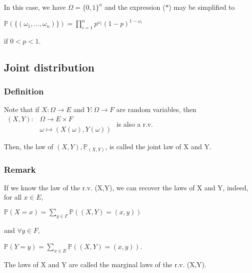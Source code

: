                 In this case, we have $\Omega=\{0,1\}^n$ and the expression ($\ast$) may be simplified to

                \centerline{$\mathbb{P}(\{(\omega_1,...,\omega_n)\}) = \displaystyle\prod_{i=1}^n p^{\omega_i} (1-p)^{1-\omega_i}$}

                if $0 < p < 1$.

        \subsection{Joint distribution}
            \subsubsection{Definition}
                Note that if $X:\Omega\rightarrow E$ and $Y:\Omega\rightarrow F$ are random variables, then
                $\begin{array}{cc}
                    (X,Y): & \Omega\rightarrow E\times F \\
                           &\omega\mapsto (X(\omega), Y(\omega))
                \end{array}$ is also a r.v.

                \vspace{5pt}

                Then, the law of $(X,Y), \mathbb{P}_{(X,Y)}$, is called the joint law of X and Y.

            \subsubsection{Remark}
                If we know the law of the r.v. (X,Y), we can recover the laws of X and Y, indeed, for all $x\in E$,

                \vspace{5pt}

                \centerline{$\mathbb{P}(X=x)=\displaystyle\sum_{y\in F} \mathbb{P}((X,Y)=(x,y))$}

                and $\forall y \in F$,

                \centerline{$\mathbb{P}(Y=y)=\displaystyle\sum_{x\in E} \mathbb{P}((X,Y)=(x,y))$.}

                \vspace{5pt}

                The laws of X and Y are called the marginal laws of the r.v. (X,Y).

                \vspace{5pt}

